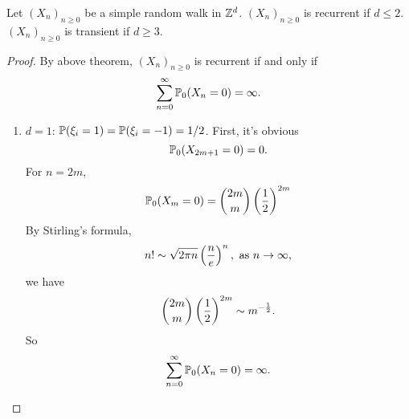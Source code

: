 \begin{exam}
    \begin{thm}
        Let $(X_n)_{n \geq 0}$ be a simple random walk in $\mathbb{Z}^d$. $(X_n)_{n \geq 0}$ is recurrent if $d \leq 2$. $(X_n)_{n \geq 0}$ is transient if $d \geq 3$.
    \end{thm}
    \begin{proof}
        By above theorem, $(X_n)_{n \geq 0}$ is recurrent if and only if
        \begin{equation*}
            \sum_{n = 0}^\infty \mathbb{P}_0(X_n = 0) = \infty.
        \end{equation*}
        \begin{enumerate}[label=(\roman{*})]
            \item $d= 1$: $\mathbb{P}(\xi_i = 1) = \mathbb{P}(\xi_i = -1) = 1/2$. First, it's obvious
            \begin{equation*}
                \mathbb{P}_0(X_{2m+1} = 0) = 0.
            \end{equation*}
            For $n = 2m$,
            \begin{equation*}
                \mathbb{P}_0(X_m = 0) = \binom{2m}{m}\left(\frac{1}{2}\right)^{2m}
            \end{equation*}
            By Stirling's formula,
            \begin{equation*}
                n! \sim \sqrt{2\pi n} \left(\frac{n}{e}\right)^n,\text{ as } n \rightarrow \infty,
            \end{equation*}
            we have
            \begin{equation*}
                \binom{2m}{m}\left(\frac{1}{2}\right)^{2m} \sim m^{-\frac{1}{2}}.
            \end{equation*}
            So
            \begin{equation*}
                \sum_{n = 0}^\infty \mathbb{P}_0(X_n = 0) = \infty.
            \end{equation*}


\end{enumerate}
\end{proof}
\end{exam}
